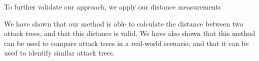 To further validate our approach, we apply our distance measurements



We have shown that our method is able to calculate the distance between two attack trees, and that this distance is valid. We have also shown that this method can be used to compare attack trees in a real-world scenario, and that it can be used to identify similar attack trees.
 

\begin{table*}[t!]
\end{table*}
